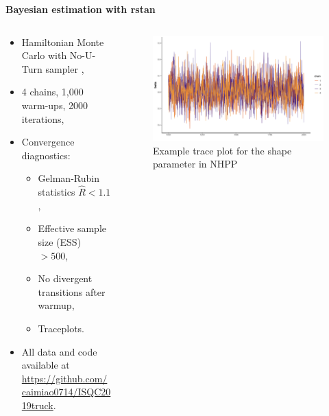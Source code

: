 \begin{frame}{\textbf{Bayesian estimation with rstan}}
\begin{columns}
\begin{column}{.65\textwidth}
\begin{itemize}
    \item Hamiltonian Monte Carlo with No-U-Turn sampler \cite{hoffman2014no, carpenter2017stan},
    \item 4 chains, 1,000 warm-ups, 2000 iterations,
    \item Convergence diagnostics:
    \begin{itemize}
        \item Gelman-Rubin statistics $\hat{R} < 1.1$ \cite{gelman1992inference},
        \item Effective sample size (ESS) $> 500$,
        \item No divergent transitions after warmup,
        \item Traceplots.
    \end{itemize}
    \item All data and code available at \href{https://github.com/caimiao0714/ISQC2019truck}{https://github.com/caimiao0714/ISQC2019truck}.
\end{itemize}
\end{column}
\hfill
\begin{column}{.35\textwidth}
\begin{figure}
  \includegraphics[width=\textwidth]{Figures/traceplot_beta.png}
  \caption{Example trace plot for the shape parameter in NHPP}
\end{figure}
\end{column}
\end{columns}
\end{frame}

